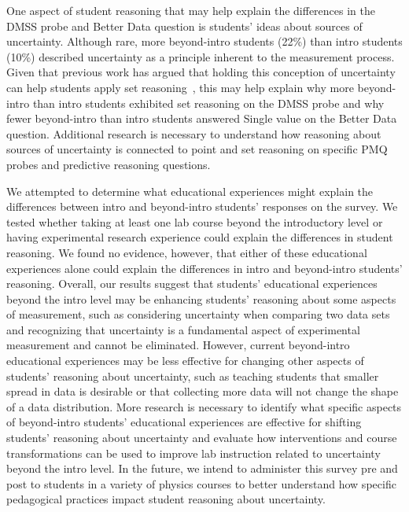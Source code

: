 \documentclass[english,aps,prstper,reprint,showpacs,longbibliography,superscriptaddress,nofootinbib]{revtex4-2}
\begin{document}
One aspect of student reasoning that may help explain the differences in the DMSS probe and Better Data question is students' ideas about sources of uncertainty. Although rare, more beyond-intro students (22\%) than intro students (10\%) described uncertainty as a principle inherent to the measurement process. Given that previous work has argued that holding this conception of uncertainty can help students apply set reasoning~\cite{Evangelinos1999,Evangelinos2002,Allie2003,Pillay2008,Buffler2008}, this may help explain why more beyond-intro than intro students exhibited set reasoning on the DMSS probe and why fewer beyond-intro than intro students answered Single value on the Better Data question. Additional research is necessary to understand how reasoning about sources of uncertainty is connected to point and set reasoning on specific PMQ probes and predictive reasoning questions.

We attempted to determine what educational experiences might explain the differences between intro and beyond-intro students' responses on the survey. We tested whether taking at least one lab course beyond the introductory level or having experimental research experience could explain the differences in student reasoning. We found no evidence, however, that either of these educational experiences alone could explain the differences in intro and beyond-intro students' reasoning. Overall, our results suggest that students' educational experiences beyond the intro level may be enhancing students' reasoning about some aspects of measurement, such as considering uncertainty when comparing two data sets and recognizing that uncertainty is a fundamental aspect of experimental measurement and cannot be eliminated. However, current beyond-intro educational experiences may be less effective for changing other aspects of students' reasoning about uncertainty, such as teaching students that smaller spread in data is desirable or that collecting more data will not change the shape of a data distribution. More research is necessary to identify what specific aspects of beyond-intro students' educational experiences are effective for shifting students' reasoning about uncertainty and evaluate how interventions and course transformations can be used to improve lab instruction related to uncertainty beyond the intro level. In the future, we intend to administer this survey pre and post to students in a variety of physics courses to better understand how specific pedagogical practices impact student reasoning about uncertainty.
 
\end{document}
